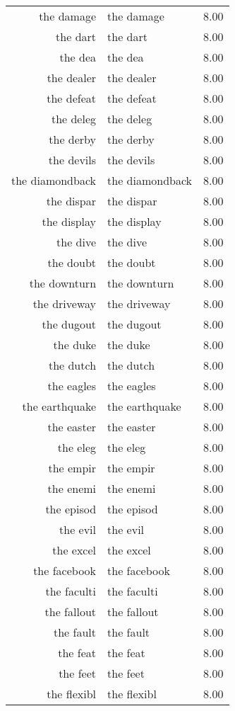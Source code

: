 \begin{table}[ht]
\begin{tabular}{rlr}
  the damage & the damage & 8.00 \\ 
  the dart & the dart & 8.00 \\ 
  the dea & the dea & 8.00 \\ 
  the dealer & the dealer & 8.00 \\ 
  the defeat & the defeat & 8.00 \\ 
  the deleg & the deleg & 8.00 \\ 
  the derby & the derby & 8.00 \\ 
  the devils & the devils & 8.00 \\ 
  the diamondback & the diamondback & 8.00 \\ 
  the dispar & the dispar & 8.00 \\ 
  the display & the display & 8.00 \\ 
  the dive & the dive & 8.00 \\ 
  the doubt & the doubt & 8.00 \\ 
  the downturn & the downturn & 8.00 \\ 
  the driveway & the driveway & 8.00 \\ 
  the dugout & the dugout & 8.00 \\ 
  the duke & the duke & 8.00 \\ 
  the dutch & the dutch & 8.00 \\ 
  the eagles & the eagles & 8.00 \\ 
  the earthquake & the earthquake & 8.00 \\ 
  the easter & the easter & 8.00 \\ 
  the eleg & the eleg & 8.00 \\ 
  the empir & the empir & 8.00 \\ 
  the enemi & the enemi & 8.00 \\ 
  the episod & the episod & 8.00 \\ 
  the evil & the evil & 8.00 \\ 
  the excel & the excel & 8.00 \\ 
  the facebook & the facebook & 8.00 \\ 
  the faculti & the faculti & 8.00 \\ 
  the fallout & the fallout & 8.00 \\ 
  the fault & the fault & 8.00 \\ 
  the feat & the feat & 8.00 \\ 
  the feet & the feet & 8.00 \\ 
  the flexibl & the flexibl & 8.00 \\ 

\end{tabular}
\end{table}
